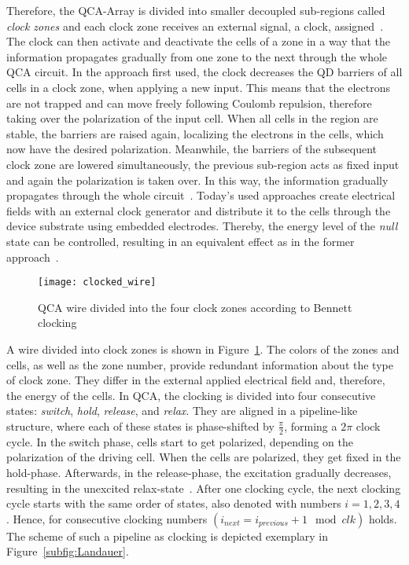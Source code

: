 Therefore, the QCA-Array is divided into smaller decoupled sub-regions called \emph{clock zones} and each clock zone receives an external signal, a clock, assigned~\cite{lent1997device}. The clock can then activate and deactivate the cells of a zone in a way that the information propagates gradually from one zone to the next through the whole QCA circuit. In the approach first used, the clock decreases the QD barriers of all cells in a clock zone, when applying a new input. This means that the electrons are not trapped and can move freely following Coulomb repulsion, therefore taking over the polarization of the input cell. When all cells in the region are stable, the barriers are raised again, localizing the electrons in the cells, which now have the desired polarization. Meanwhile, the barriers of the subsequent clock zone are lowered simultaneously, the previous sub-region acts as fixed input and again the polarization is taken over. In this way, the information gradually propagates through the whole circuit~\cite{lent1997device}. Today's used approaches create electrical fields with an external clock generator and distribute it to the cells through the device substrate using embedded electrodes. Thereby, the energy level of the \textit{null} state can be controlled, resulting in an equivalent effect as in the former approach~\cite{Walter}.

\begin{figure}
	\centering
	\texttt{[image: clocked\_wire]}
	\caption{QCA wire divided into the four clock zones according to Bennett clocking}\label{fig:QCA_wire_clocked}
\end{figure}

A wire divided into clock zones is shown in Figure~\ref{fig:QCA_wire_clocked}. The colors of the zones and cells, as well as the zone number, provide redundant information about the type of clock zone. They differ in the external applied electrical field and, therefore, the energy of the cells. In QCA, the clocking is divided into four consecutive states: \emph{switch}, \emph{hold}, \emph{release}, and \emph{relax}. They are aligned in a pipeline-like structure, where each of these states is phase-shifted by $\frac{\pi}{2}$, forming a $2\pi$ clock cycle. In the switch phase, cells start to get polarized, depending on the polarization of the driving cell. When the cells are polarized, they get fixed in the hold-phase. Afterwards, in the release-phase, the excitation gradually decreases, resulting in the unexcited relax-state~\cite{Sasamal2020QuantumDotCA}. After one clocking cycle, the next clocking cycle starts with the same order of states, also denoted with numbers $i = {1, 2, 3, 4}$. Hence, for consecutive clocking numbers $(i_{next} = i_{previous}+1 \mod clk)$ holds. The scheme of such a pipeline as clocking is depicted exemplary in Figure~\ref{subfig:Landauer}.

